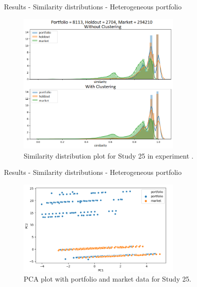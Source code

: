 
\begin{frame}{Results - Similarity distributions - Heterogeneous portfolio}
    \begin{figure}
       \centering
       \includegraphics[width=8cm]{fig/ch4-bump-study-25.png}
       \caption{Similarity distribution plot for Study 25 in experiment \nameExperimentII{}.}
    \end{figure}
\end{frame}


\begin{frame}{Results - Similarity distributions - Heterogeneous portfolio}
    \begin{figure}
       \centering
       \caption{PCA plot with portfolio and market data for Study 25.}
       \includegraphics[width=8cm]{fig/ch4-study-25-pca.png}
    \end{figure}
\end{frame}


